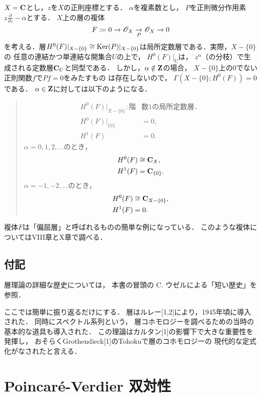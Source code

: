 \(X=\mathbf{C}\)とし，\(z\)を\(X\)の正則座標とする．
\(\alpha\)を複素数とし，
\(P\)を正則微分作用素\(
    \displaystyle z\frac{\partial}{\partial{z}}-\alpha
\)とする．
\(X\)上の層の複体
\begin{equation}
    F\coloneq 0\to \mathscr{O}_X\underset{P}{\to}\mathscr{O}_X\to0
\end{equation}
を考える．層\(
    H^0(F)\rvert_{X-\{0\}}\cong\mathop{\mathrm{Ker}}\nolimits(P)\rvert_{X-\{0\}}
\)は局所定数層である．実際，\(X-\{0\}\)の
任意の連結かつ単連結な開集合\(U\)の上で，
\(H^0(F)\rvert_{U}\)は，
\(z^\alpha\)（の分枝）で生成される定数層\(\mathbf{C}_U\)と同型である．
しかし，\(\alpha\notin\mathbf{Z}\)の場合，
\(X-\{0\}\)上の0でない正則関数\(f\)で\(Pf=0\)をみたすもの
は存在しないので，
\(\Gamma(X-\{0\};H^0(F))=0\)である．
\(\alpha\in\mathbf{Z}\)に対しては以下のようになる．
\begin{quotation}
    \begin{align*}
        H^0(F)\rvert_{X-\{0\}}\colon\text{階}&\text{数} 1\text{の局所定数層．}\\
        H^0(F)\rvert_{\{0\}}&=0,\\
        H^1(F)&=0.
    \end{align*}
    \(\alpha=0,1,2,\dots\)のとき，
    \begin{align*}
        H^0(F)&\cong\mathbf{C}_X,\\
        H^1(F)&=\mathbf{C}_{\{0\}}.
    \end{align*}
    \(\alpha=-1,-2,\dots\)のとき，
    \begin{align*}
        H^0(F)&\cong\mathbf{C}_{X-\{0\}},\\
        H^1(F)&=0.
    \end{align*}
\end{quotation}
複体\(F\)は「偏屈層」と呼ばれるものの簡単な例になっている．
このような複体についてはVIII章とX章で調べる．

\section*{付記}
層理論の詳細な歴史については，
本書の冒頭の C. ウゼルによる「短い歴史」を参照．

ここでは簡単に振り返るだけにする．
層はルレー[1,2]により，1945年頃に導入された．
同時にスペクトル系列という，
層コホモロジーを調べるための当時の基本的な道具も導入された．
この理論はカルタン[1]の影響下で大きな重要性を発揮し，
おそらくGrothendieck[1]のTohokuで層のコホモロジーの
現代的な定式化がなされたと言える．



\chapter{Poincar\'e-Verdier 双対性}

